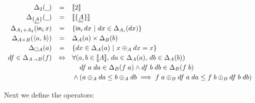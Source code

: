 \documentclass{rntz}
\begin{document}
\[
\def\arraystretch{1.2}
\begin{array}{rcl}
  \Change{\tbool}{\pwild} &=& \Den{\tbool}
  \\
  \Change{\Seteq{A}}{\pwild} &=& \Den{\Seteq{A}}
  \\
  \Change{A_1 + A_2}{\inj{i}{x}}
  &=& \setfor{\inj{i}{dx}}{dx \in \Change{A_i}{dx}}
  \\
  \Change{A \x B}{\pair{a}{b}}
  &=& \Change{A}{a} \x \Change{B}{b}
  \\
  \Change{\Disc{A}}{a}
  &=& \setfor{dx \in \Change{A}{a}}{x \oplus_A dx = x}
  \\
  df \in \Change{A \to B}{f}
  &\Leftrightarrow&
  \forall({a,b \in \Den{A}},\, da \in \Change{A}{a},\, db \in \Change{A}{b})\\
  &&\phantom{{}\wedge{}}
  df\; a\; da \in \Change{B}{f\; a}
  \wedge df\;b\;db \in \Change{B}{f\; b}
  \\
  &&{}\wedge (a \oplus_A da \le b \oplus_A db \implies
  f\;a \oplus_B df\;a\;da \le f\;b \oplus_B df\;b\;db)
\end{array}
\]

Next we define the operators:
\begin{center}
\end{center}
\end{document}
